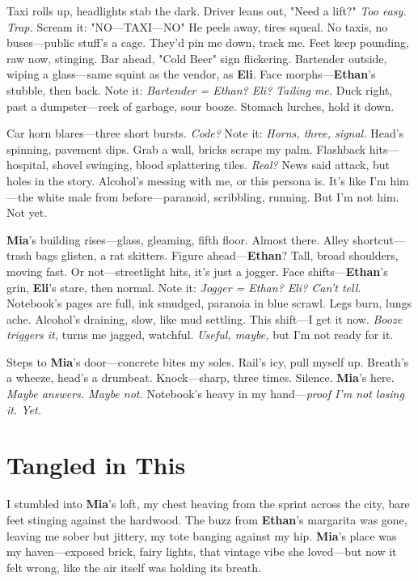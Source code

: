 \documentclass{article}
\begin{document}
Taxi rolls up, headlights stab the dark. Driver leans out, "Need a lift?" \textit{Too easy. Trap.} Scream it: "NO—TAXI—NO" He peels away, tires squeal. No taxis, no buses—public stuff’s a cage. They’d pin me down, track me. Feet keep pounding, raw now, stinging. Bar ahead, "Cold Beer" sign flickering. Bartender outside, wiping a glass—same squint as the vendor, as \textbf{Eli}. Face morphs—\textbf{Ethan}’s stubble, then back. Note it: \textit{Bartender = Ethan? Eli? Tailing me.} Duck right, past a dumpster—reek of garbage, sour booze. Stomach lurches, hold it down.

Car horn blares—three short bursts. \textit{Code?} Note it: \textit{Horns, three, signal.} Head’s spinning, pavement dips. Grab a wall, bricks scrape my palm. Flashback hits—hospital, shovel swinging, blood splattering tiles. \textit{Real?} News said attack, but holes in the story. Alcohol’s messing with me, or this persona is. It’s like I’m him—the white male from before—paranoid, scribbling, running. But I’m not him. Not yet.

\textbf{Mia}’s building rises—glass, gleaming, fifth floor. Almost there. Alley shortcut—trash bags glisten, a rat skitters. Figure ahead—\textbf{Ethan}? Tall, broad shoulders, moving fast. Or not—streetlight hits, it’s just a jogger. Face shifts—\textbf{Ethan}’s grin, \textbf{Eli}’s stare, then normal. Note it: \textit{Jogger = Ethan? Eli? Can’t tell.} Notebook’s pages are full, ink smudged, paranoia in blue scrawl. Legs burn, lungs ache. Alcohol’s draining, slow, like mud settling. This shift—I get it now. \textit{Booze triggers it,} turns me jagged, watchful. \textit{Useful, maybe,} but I’m not ready for it.

Steps to \textbf{Mia}’s door—concrete bites my soles. Rail’s icy, pull myself up. Breath’s a wheeze, head’s a drumbeat. Knock—sharp, three times. Silence. \textbf{Mia}’s here. \textit{Maybe answers. Maybe not.} Notebook’s heavy in my hand—\textit{proof I’m not losing it. Yet.}

\section*{Tangled in This}

I stumbled into \textbf{Mia}’s loft, my chest heaving from the sprint across the city, bare feet stinging against the hardwood. The buzz from \textbf{Ethan}’s margarita was gone, leaving me sober but jittery, my tote banging against my hip. \textbf{Mia}’s place was my haven—exposed brick, fairy lights, that vintage vibe she loved—but now it felt wrong, like the air itself was holding its breath.
\end{document}
